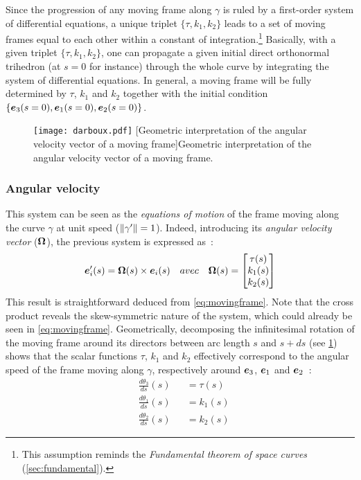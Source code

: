 Since the progression of any moving frame along $\gamma$ is ruled by a first-order system of differential equations, a unique triplet $\{\tau, k_{1}, k_{2}\}$ leads to a set of moving frames equal to each other within a constant of integration.\footnote{This assumption reminds the \emph{Fundamental theorem of space curves} (\cref{sec:fundamental}).} Basically, with a given triplet $\{\tau, k_{1}, k_{2}\}$, one can propagate a given initial direct orthonormal trihedron (at $s=0$ for instance) through the whole curve by integrating the system of differential equations. In general, a moving frame will be fully determined by $\tau$, $k_{1}$ and $k_{2}$ together with the initial condition $\{\boldsymbol{e}_{3}(s=0),\boldsymbol{e}_{1}(s=0),\boldsymbol{e}_{2}(s=0)\}$.

\begin{figure}[t]
\centering
\texttt{[image: darboux.pdf]}
[Geometric interpretation of the angular velocity vector of a moving frame]{Geometric interpretation of the angular velocity vector of a moving frame.}
\label{fig:3_4}
\end{figure}

\subsubsection{Angular velocity}
This system can be seen as the \emph{equations of motion} of the frame moving along the curve $\gamma$ at unit speed ($\lVert\gamma'\rVert=1$). Indeed, introducing its \emph{angular velocity vector} ($\boldsymbol{\Omega}$), the previous system is expressed as~:
\begin{equation}
	\boldsymbol{e}'_{i}(s) = \boldsymbol{\Omega}(s) \times \boldsymbol{e}_{i}(s)
	\quad avec \quad
	\boldsymbol{\Omega}(s)
	=
	\begin{bmatrix}
		\tau(s) \\
		k_1(s) \\
		k_2(s)
	\end{bmatrix}
\end{equation}
This result is straightforward deduced from \cref{eq:movingframe}. Note that the cross product reveals the skew-symmetric nature of the system, which could already be seen in \cref{eq:movingframe}.
Geometrically, decomposing the infinitesimal rotation of the moving frame around its directors between arc length $s$ and $s+ds$ (see \cref{fig:3_4}) shows that the scalar functions $\tau$, $k_{1}$ and $k_{2}$ effectively correspond to the angular speed of the frame moving along $\gamma$, respectively around $\boldsymbol{e}_{3}$, $\boldsymbol{e}_{1}$ and $\boldsymbol{e}_{2}$~:
\begin{subequations}
	\begin{alignat}{2}
		&\frac{d\theta_3}{ds}(s) &&= \tau(s)
		\\[0.5em]
		&\frac{d\theta_1}{ds}(s) &&= k_{1}(s)
		\\[0.5em]
		&\frac{d\theta_2}{ds}(s) &&= k_{2}(s)
	\end{alignat}
\end{subequations}

